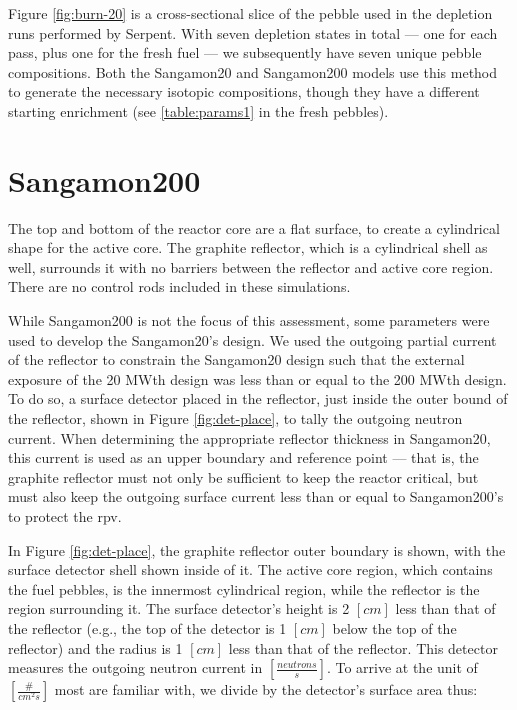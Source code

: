 

Figure \ref{fig:burn-20} is a cross-sectional slice of the pebble used in the depletion runs performed by Serpent.  With seven depletion states in total --- one for each pass, plus one for the fresh fuel --- we subsequently have seven unique pebble compositions.  Both the Sangamon20 and Sangamon200 models use this method to generate the necessary isotopic compositions, though they have a different starting enrichment (see \ref{table:params1} in the fresh pebbles).


\section{Sangamon200}
\label{s200}
The top and bottom of the reactor core are a flat surface, to create a cylindrical shape for the active core.  The graphite reflector, which is a cylindrical shell as well, surrounds it with no barriers between the reflector and active core region. There are no control rods included in these simulations.



While Sangamon200 is not the focus of this assessment, some parameters were used to develop the Sangamon20's design.  We used the outgoing partial current of the reflector to constrain the Sangamon20 design such that the external exposure of the 20 MWth design was less than or equal to the 200 MWth design.  To do so, a surface detector placed in the reflector, just inside the outer bound of the reflector, shown in Figure \ref{fig:det-place}, to tally the outgoing neutron current.  When determining the appropriate reflector thickness in Sangamon20, this current is used as an upper boundary and reference point --- that is, the graphite reflector must not only be sufficient to keep the reactor critical, but must also keep the outgoing surface current less than or equal to Sangamon200's to protect the \acrshort{rpv}.



In Figure \ref{fig:det-place}, the graphite reflector outer boundary is shown, with the surface detector shell shown inside of it.  The active core region, which contains the fuel pebbles, is the innermost cylindrical region, while the reflector is the region surrounding it.  The surface detector's height is 2 $\left[cm\right]$ less than that of the reflector (e.g., the top of the detector is 1 $\left[cm\right]$ below the top of the reflector) and the radius is 1 $\left[cm\right]$ less than that of the reflector.  This detector measures the outgoing neutron current in $\left[\frac{neutrons}{s}\right]$.  To arrive at the unit of $\left[\frac{\#}{cm^2s}\right]$ most are familiar with, we divide by the detector's surface area thus:

